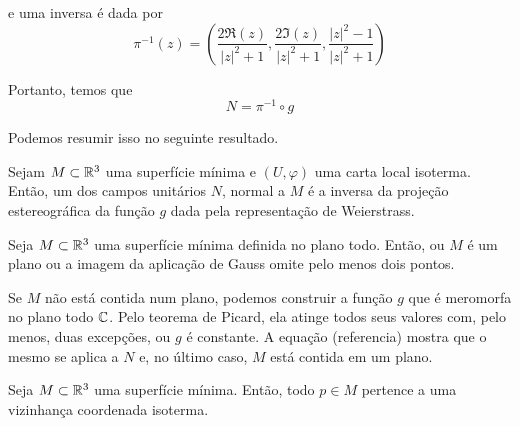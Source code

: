 \begin{exemplo}
	e uma inversa é dada por
	\begin{equation*}
	\pi^{-1}(z) = \left( \frac{2 \Re(z)}{|z|^2 + 1}, \frac{2 \Im(z)}{|z|^2 + 1}, \frac{|z|^2 - 1}{|z|^2 + 1} \right)
	\end{equation*}
	
	Portanto, temos que
	\begin{equation*}
	N = \pi^{-1} \circ g
	\end{equation*}
	
	Podemos resumir isso no seguinte resultado.
\end{exemplo}

\begin{proposicao}
	Sejam $M \subset \mathbb{R}^3$ uma superfície mínima e $(U, \varphi)$ uma carta local isoterma. Então, um dos campos unitários $N$, normal a $M$ é a inversa da projeção estereográfica da função $g$ dada pela representação de Weierstrass.
\end{proposicao}

\begin{corolario}
	Seja $M \subset \mathbb{R}^3$ uma superfície mínima definida no plano todo. Então, ou $M$ é um plano ou a imagem da aplicação de Gauss omite pelo menos dois pontos.
\end{corolario}

\begin{demonstracao}
	Se $M$ não está contida num plano, podemos construir a função $g$ que é meromorfa no plano todo $\mathbb{C}$. Pelo teorema de Picard, ela atinge todos seus valores com, pelo menos, duas excepções, ou $g$ é constante. A equação (referencia) mostra que o mesmo se aplica a $N$ e, no último caso, $M$ está contida em um plano.
\end{demonstracao}

\begin{teorema}
	Seja $M \subset \mathbb{R}^3$ uma superfície mínima. Então, todo $p \in M$ pertence a uma vizinhança coordenada isoterma.
\end{teorema}

